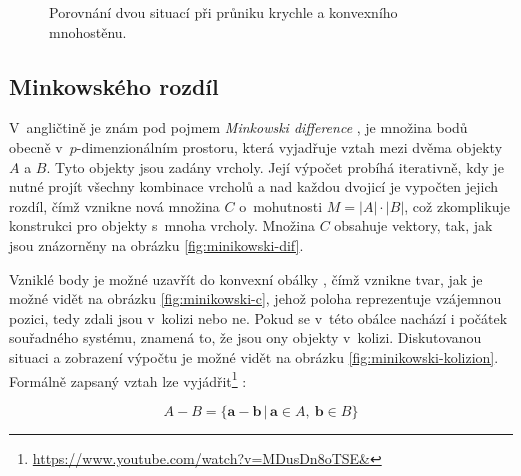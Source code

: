 \begin{figure}
   \caption{Porovnání dvou situací při průniku krychle a konvexního mnohostěnu.} 
    \label{fig:gjk-basic}

    
\end{figure}

\subsection*{Minkowského rozdíl}
V~angličtině je znám pod pojmem \emph{Minkowski difference} \cite{minikowski}, je množina bodů obecně v~\(p\)-dimenzionálním prostoru, která vyjadřuje vztah mezi dvěma objekty \(A\) a \(B\). Tyto objekty jsou zadány vrcholy. Její výpočet probíhá iterativně, kdy je nutné projít všechny kombinace vrcholů a nad každou dvojicí je vypočten jejich rozdíl, čímž vznikne nová množina \(C\) o~mohutnosti \(M = |A| \cdot |B|\), což zkomplikuje konstrukci pro objekty s~mnoha vrcholy. Množina \(C\) obsahuje vektory, tak, jak jsou znázorněny na obrázku \ref{fig:minikowski-dif}.

Vzniklé body je možné uzavřít do konvexní obálky \cite{minikowski}, čímž vznikne tvar, jak je možné vidět na obrázku \ref{fig:minikowski-c}, jehož poloha reprezentuje vzájemnou pozici, tedy zdali jsou v~kolizi nebo ne. Pokud se v~této obálce nachází i počátek souřadného systému, znamená to, že jsou ony objekty v~kolizi. Diskutovanou situaci a zobrazení výpočtu je možné vidět na obrázku \ref{fig:minikowski-kolizion}. Formálně zapsaný vztah lze vyjádřit\footnote{\url{https://www.youtube.com/watch?v=MDusDn8oTSE&}} \cite{minikowski}:

\[
A-B=\{ \mathbf {a} -\mathbf {b} \,|\,\mathbf {a} \in A,\ \mathbf {b} \in B\}
\]


